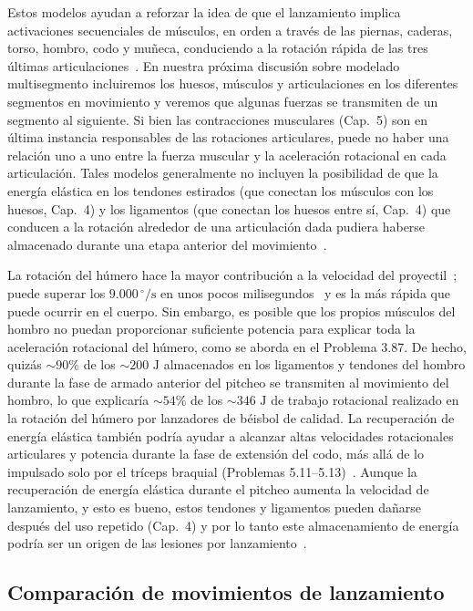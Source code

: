 \documentclass[12pt]{book}
\begin{document}
Estos modelos ayudan a reforzar la idea de que el lanzamiento implica activaciones secuenciales de músculos, en orden a través de las piernas, caderas, torso, hombro, codo y muñeca, conduciendo a la rotación rápida de las tres últimas articulaciones~\cite{ref26,ref40,ref46,ref71,ref114,ref121}. En nuestra próxima discusión sobre modelado multisegmento incluiremos los huesos, músculos y articulaciones en los diferentes segmentos en movimiento y veremos que algunas fuerzas se transmiten de un segmento al siguiente. Si bien las contracciones musculares (Cap.~5) son en última instancia responsables de las rotaciones articulares, puede no haber una relación uno a uno entre la fuerza muscular y la aceleración rotacional en cada articulación. Tales modelos generalmente no incluyen la posibilidad de que la energía elástica en los tendones estirados (que conectan los músculos con los huesos, Cap.~4) y los ligamentos (que conectan los huesos entre sí, Cap.~4) que conducen a la rotación alrededor de una articulación dada pudiera haberse almacenado durante una etapa anterior del movimiento~\cite{ref121}.

La rotación del húmero hace la mayor contribución a la velocidad del proyectil~\cite{ref72}; puede superar los $9.000\,^\circ/\text{s}$ en unos pocos milisegundos~\cite{ref114} y es la más rápida que puede ocurrir en el cuerpo. Sin embargo, es posible que los propios músculos del hombro no puedan proporcionar suficiente potencia para explicar toda la aceleración rotacional del húmero, como se aborda en el Problema 3.87. De hecho, quizás $\sim 90\%$ de los $\sim 200\text{ J}$ almacenados en los ligamentos y tendones del hombro durante la fase de armado anterior del pitcheo se transmiten al movimiento del hombro, lo que explicaría $\sim 54\%$ de los $\sim 346\text{ J}$ de trabajo rotacional realizado en la rotación del húmero por lanzadores de béisbol de calidad. La recuperación de energía elástica también podría ayudar a alcanzar altas velocidades rotacionales articulares y potencia durante la fase de extensión del codo, más allá de lo impulsado solo por el tríceps braquial (Problemas 5.11--5.13)~\cite{ref121}. Aunque la recuperación de energía elástica durante el pitcheo aumenta la velocidad de lanzamiento, y esto es bueno, estos tendones y ligamentos pueden dañarse después del uso repetido (Cap.~4) y por lo tanto este almacenamiento de energía podría ser un origen de las lesiones por lanzamiento~\cite{ref46}.

\subsection{Comparación de movimientos de lanzamiento}
\end{document}
